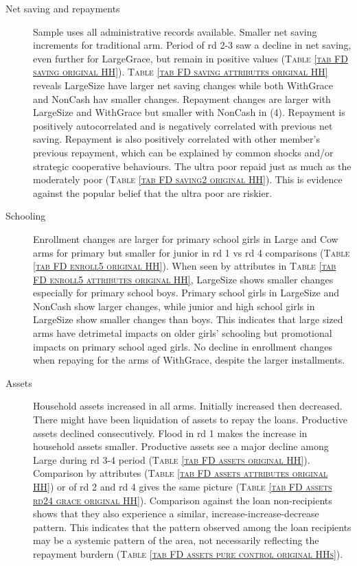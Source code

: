 \begin{description}
\vspace{1.0ex}\setlength{\itemsep}{1.0ex}\setlength{\baselineskip}{12pt}
\item[Net saving and repayments]	 Sample uses all administrative records available. Smaller net saving increments for \textsf{traditional} arm. Period of rd 2-3 saw a decline in net saving, even further for \textsf{LargeGrace}, but remain in positive values (\textsc{Table \ref{tab FD saving original HH}}). \textsc{\normalsize Table \ref{tab FD saving attributes original HH}} reveals \textsf{LargeSize} have larger net saving changes while both \textsf{WithGrace} and \textsf{NonCash} hav smaller changes. Repayment changes are larger with \textsf{LargeSize} and \textsf{WithGrace} but smaller with \textsf{NonCash} in (4). Repayment is positively autocorrelated and is negatively correlated with previous net saving. Repayment is also positively correlated with other member's previous repayment, which can be explained by common shocks and/or strategic cooperative behaviours. 
The ultra poor repaid just as much as the moderately poor (\textsc{Table \ref{tab FD saving2 original HH}}). This is evidence against the popular belief that the ultra poor are riskier.  
\item[Schooling]	Enrollment changes are larger for primary school girls in \textsf{Large} and \textsf{Cow} arms for primary but smaller for junior in rd 1 vs rd 4 comparisons (\textsc{Table \ref{tab FD enroll5 original HH}}). When seen by attributes in \textsc{\normalsize Table \ref{tab FD enroll5 attributes original HH}}, \textsf{LargeSize} shows smaller changes especially for primary school boys. Primary school girls in \textsf{LargeSize} and \textsf{NonCash} show larger changes, while junior and high school girls in \textsf{LargeSize} show smaller changes than boys. This indicates that large sized arms have detrimetal impacts on older girls' schooling but promotional impacts on primary school aged girls. No decline in enrollment changes when repaying for the arms of \textsf{WithGrace}, despite the larger installments.
\item[Assets]	Household assets increased in all arms. Initially increased then decreased. There might have been liquidation of assets to repay the loans. Productive assets declined consecutively. Flood in rd 1 makes the increase in household assets smaller. Productive assets see a major decline among \textsf{Large} during rd 3-4 period (\textsc{\normalsize Table \ref{tab FD assets original HH}}). Comparison by attributes (\textsc{\normalsize Table \ref{tab FD assets attributes original HH}}) or of rd 2 and rd 4 gives the same picture (\textsc{\normalsize Table \ref{tab FD assets rd24 grace original HH}}). Comparison against the loan non-recipients shows that they also experience a similar, increase-increase-decrease pattern. This indicates that the pattern observed among the loan recipients may be a systemic pattern of the area, not necessarily reflecting the repayment burdern (\textsc{\normalsize Table \ref{tab FD assets pure control original HHs}}).

\end{description}
